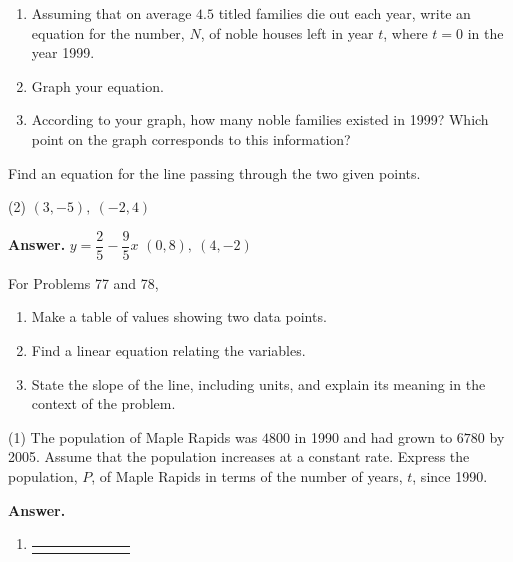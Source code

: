 \documentclass[10pt,]{book}
\theoremstyle{plain}
\theoremstyle{definition}
\theoremstyle{definition}
\theoremstyle{definition}
\theoremstyle{definition}
\numberwithin{equation}{part}
\newcommand{\hrulethick} {\noalign{\hrule height 0.11em}}
\begin{document}
\begin{exerciselist}
\begin{enumerate}[label=*\alph**]
\item\hypertarget{li-1653}{}Assuming that on average \(4.5\) titled families die out each year, write an equation for the number, \(N\), of noble houses left in year \(t\), where \(t = 0\) in the year 1999.%
\item\hypertarget{li-1654}{}Graph your equation.%
\item\hypertarget{li-1655}{}According to your graph, how many noble families existed in 1999? Which point on the graph corresponds to this information?%
\end{enumerate}
%
\par\smallskip
\hypertarget{exercisegroup-66}{}\par\noindent Find an equation for the line passing through the two given points.%
\begin{exercisegroup}(2)
\exercise[75.]\hypertarget{exercise-471}{}\((3, -5), ~(-2, 4)\)%
\par\smallskip
\noindent\textbf{Answer.}\hypertarget{answer-260}{}\quad
\(y = \dfrac{2}{5}- \dfrac{9}{5}x\)%
\exercise[76.]\hypertarget{exercise-472}{}\((0, 8), ~(4, -2)\)%
\end{exercisegroup}
\par\smallskip\noindent
\hypertarget{exercisegroup-67}{}\par\noindent For Problems 77 and 78, \leavevmode%
\begin{enumerate}[label=*\alph**]
\item\hypertarget{li-1656}{}Make a table of values showing two data points.%
\item\hypertarget{li-1657}{}Find a linear equation relating the variables.%
\item\hypertarget{li-1658}{}State the slope of the line, including units, and explain its meaning in the context of the problem.%
\end{enumerate}
%
\begin{exercisegroup}(1)
\exercise[77.]\hypertarget{exercise-473}{}The population of Maple Rapids was \(4800\) in 1990 and had grown to \(6780\) by 2005. Assume that the population increases at a constant rate. Express the population, \(P\), of Maple Rapids in terms of the number of years, \(t\), since 1990.%
\par\smallskip
\noindent\textbf{Answer.}\hypertarget{answer-261}{}\quad
\leavevmode%
\begin{enumerate}[label=*\alph**]
\item\hypertarget{li-1659}{}\begin{tabular}{AcAcAcA}\hrulethick

\end{tabular}
\end{enumerate}
\end{exercisegroup}
\end{exerciselist}
\end{document}
